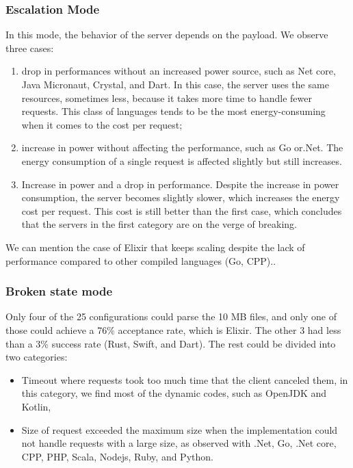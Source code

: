 \subsubsection{Escalation Mode}
In this mode, the behavior of the server depends on the payload. We observe three cases:
\begin{enumerate}
    \item drop in performances without an increased power source, such as Net core, Java Micronaut, Crystal, and Dart.
    In this case, the server uses the same resources, sometimes less, because it takes more time to handle fewer requests.
    This class of languages tends to be the most energy-consuming when it comes to the cost per request;
    \item increase in power without affecting the performance, such as Go or.Net.
    The energy consumption of a single request is affected slightly but still increases.
    \item Increase in power and a drop in performance.
    Despite the increase in power consumption, the server becomes slightly slower, which increases the energy cost per request.
    This cost is still better than the first case, which concludes that the servers in the first category are on the verge of breaking.
\end{enumerate}

We can mention the case of Elixir that keeps scaling despite the lack of performance compared to other compiled languages (Go, CPP)..

\subsubsection{Broken state mode }
Only four of the 25 configurations could parse the 10 MB files, and only one of those could achieve a 76\% acceptance rate, which is Elixir. The other 3 had less than a 3\% success rate (Rust, Swift, and Dart).
The rest could be divided into two categories:
\begin{itemize}
    \item \textsf{Timeout} where requests took too much time that the client canceled them, in this category, we find most of the dynamic codes, such as OpenJDK and Kotlin,
    \item \textsf{Size of request} exceeded the maximum size when the implementation could not handle requests with a large size, as observed with .Net, Go, .Net core, CPP, PHP, Scala, Nodejs, Ruby, and Python.
\end{itemize}



